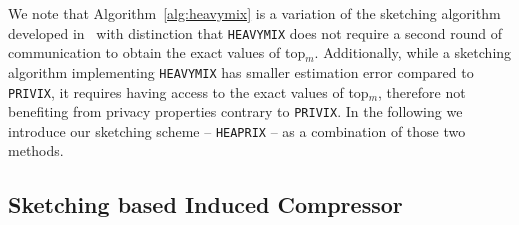 \documentclass[twoside]{article}
\newtheorem{lemma}{Lemma}
\begin{document}
We note that Algorithm~\ref{alg:heavymix} is a variation of the sketching algorithm developed in~\cite{ivkin2019communication} with distinction that \texttt{HEAVYMIX} does not require a second round of communication to obtain the exact values of top$_m$. 
Additionally, while a sketching algorithm implementing \texttt{HEAVYMIX} has smaller estimation error compared to \texttt{PRIVIX}, it requires having access to the exact values of top$_m$, therefore not benefiting from privacy properties contrary to \texttt{PRIVIX}. 
In the following we introduce our sketching scheme -- \texttt{HEAPRIX} -- as a combination of those two methods. 

\vspace{-0.05in}
\subsection{Sketching based Induced Compressor}
\vspace{-0.05in}
\end{document}
